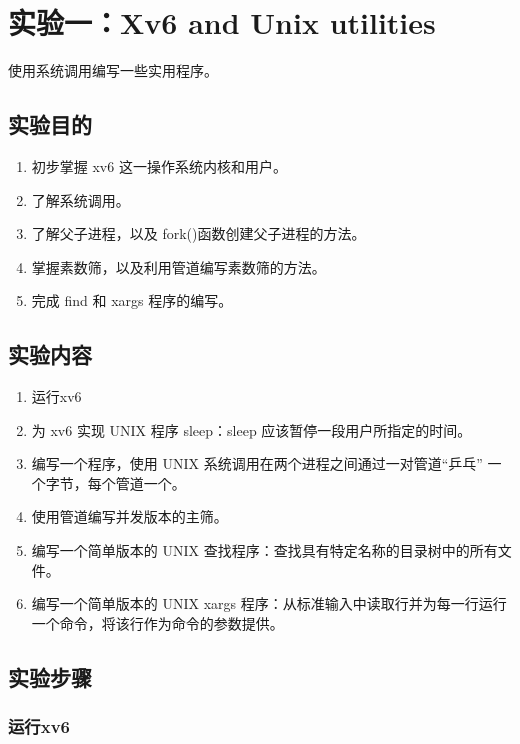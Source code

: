 \section{实验一：Xv6 and Unix utilities}\label{sec:Xv6 and Unix utilities}

使用系统调用编写一些实用程序。

\subsection{实验目的}

\begin{enumerate}
	\item 初步掌握 xv6 这一操作系统内核和用户。
	\item 了解系统调用。
	\item 了解父子进程，以及 fork()函数创建父子进程的方法。
	\item 掌握素数筛，以及利用管道编写素数筛的方法。
	\item 完成 find 和 xargs 程序的编写。
\end{enumerate}

\subsection{实验内容}

\begin{enumerate}
	\item 运行xv6
	\item 为 xv6 实现 UNIX 程序 sleep：sleep 应该暂停一段用户所指定的时间。
	\item 编写一个程序，使用 UNIX 系统调用在两个进程之间通过一对管道“乒乓” 一个字节，每个管道一个。
	\item 使用管道编写并发版本的主筛。
	\item 编写一个简单版本的 UNIX 查找程序：查找具有特定名称的目录树中的所有文件。
	\item 编写一个简单版本的 UNIX xargs 程序：从标准输入中读取行并为每一行运行一个命令，将该行作为命令的参数提供。
\end{enumerate}

\subsection{实验步骤}

\subsubsection{运行xv6}

